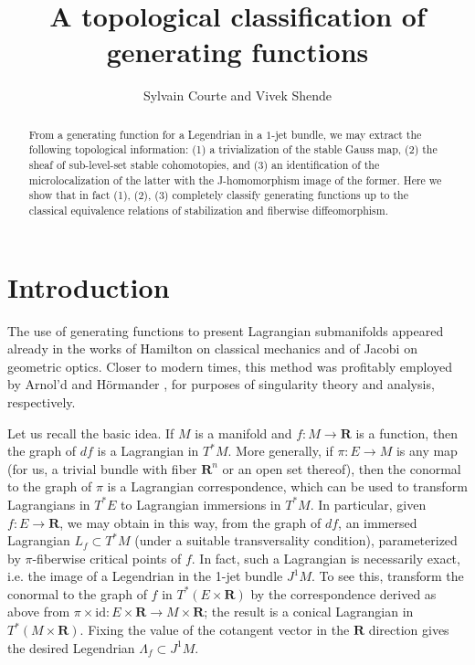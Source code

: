 \documentclass[12pt,a4paper]{article}
\title{A topological classification of generating functions}
\author{Sylvain Courte and Vivek Shende}
\date{}
\numberwithin{equation}{section}
\theoremstyle{definition}
\theoremstyle{remark}
\newcommand{\R}{\mathbf{R}}
\newcommand{\id}{\mathrm{id}}
\begin{document}
\maketitle

\begin{abstract}
    From a generating function for a Legendrian in a $1$-jet bundle, we may extract the following topological information: (1) a trivialization of the
    stable Gauss map, (2) the sheaf of sub-level-set stable cohomotopies, and (3) an identification of the microlocalization of the latter with the J-homomorphism image of the former.  Here we show that in fact (1), (2), (3) completely classify generating functions up to the classical equivalence relations of stabilization and fiberwise diffeomorphism.
\end{abstract}

\small
\setcounter{tocdepth}{2}
\renewcommand\contentsname{\vspace*{-20pt}}
\tableofcontents
\normalsize
\thispagestyle{empty}


\section{Introduction}\label{sec:intro}

The use of generating functions to present Lagrangian submanifolds appeared already in the works of Hamilton on classical mechanics and of Jacobi on geometric optics. Closer to modern times, this method was profitably employed  by Arnol'd \cite{Arnold} and H\"ormander \cite{Hormander}, for purposes of singularity theory and analysis, respectively.

Let us recall the basic idea.  If $M$ is a manifold and $f: M \to \R$ is a function, then the graph of $df$ is a Lagrangian in $T^*M$.  More generally, if $\pi: E \to M$ is any map (for us, a trivial bundle with fiber $\R^n$ or an open set thereof), then the conormal to the graph of $\pi$ is a Lagrangian correspondence, which can be used to transform Lagrangians in $T^*E$ to Lagrangian immersions in $T^* M$.  In particular, given $f: E \to \R$, we may obtain in this way, from the graph of $df$, an immersed Lagrangian $L_f \subset T^*M$ (under a suitable transversality condition), parameterized by $\pi$-fiberwise critical points of $f$.  In fact, such a Lagrangian is necessarily exact, i.e. the image of a Legendrian in the 1-jet bundle $J^1 M$.  To see this, transform the conormal to the graph of $f$ in $T^*(E \times \R)$ by  the correspondence derived as above from $\pi\times \id:E\times \R \to M \times \R$; the result is a conical Lagrangian in $T^*(M \times \R)$.  Fixing the value of the cotangent vector in the $\R$ direction gives the desired Legendrian $\Lambda_f \subset J^1 M$.
\end{document}
